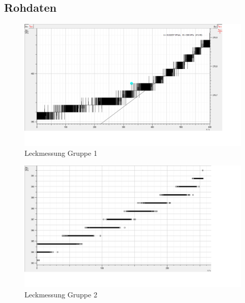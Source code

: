 \documentclass[11pt]{beamer}
\begin{document}
\subsection{Rohdaten}
\begin{frame}
\begin{figure}[H]
\centering
\includegraphics[scale=0.3]{Bilder/dichtigkeit_raw_JM.png}
\caption{Leckmessung Gruppe 1}
\end{figure}
\end{frame}

\begin{frame}
\begin{figure}[H]
\centering
\includegraphics[scale=0.3]{Bilder/dichtigkeit_raw_EL.png}
\caption{Leckmessung Gruppe 2}
\end{figure}
\end{frame}
\end{document}
